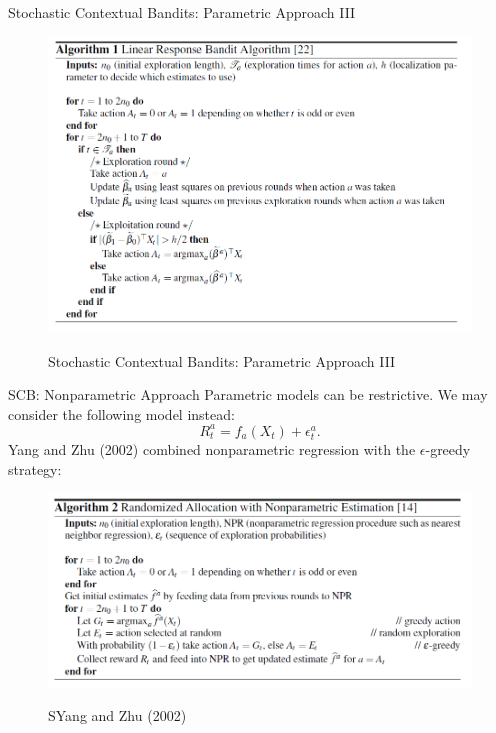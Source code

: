 \documentclass[english]{article}
\begin{document}
\item {Stochastic Contextual Bandits: Parametric Approach III}
    \begin{figure}
        \centering
        \includegraphics[scale = 0.45]{Alg_1.PNG}
        \label{Stochastic Contextual Bandits: Parametric Approach III}
        \caption{Stochastic Contextual Bandits: Parametric Approach III}
    \end{figure}


\item {SCB: Nonparametric Approach}
    Parametric models can be restrictive. We may consider the following model instead: \[
    R_t^a = f_a(X_t) + \epsilon_t^a.
    \]
    Yang and Zhu (2002) combined nonparametric regression with the $\epsilon$-greedy strategy:
    \begin{figure}
        \centering
        \includegraphics[scale = 0.47]{Alg_2.PNG}
        \label{Yang and Zhu (2002)}
        \caption{SYang and Zhu (2002)}
    \end{figure}
\end{document}
